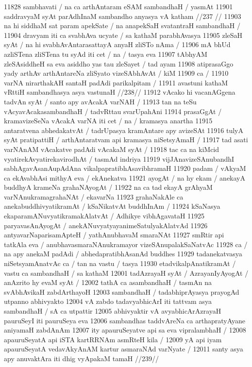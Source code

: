 11828 sambhavati / na ca arthAntaram eSAM sambandhaH / yasmAt
11901 	saddravyaM syAt parAdhInaM sambandho anyasya vA katham //237 //
11903 na hi siddhaM sat param apekSate / na anapekSaH svatantraH sambandhaH /
11904 dravyam iti ca svabhAva ucyate / sa kathaM parabhAvasya  
11905 zleSaH syAt / na hi svabhAvAntarasattayA anyaH zliSTo nAma / 
11906 mA bhUd azliSTena zliSTena tu syAd iti cet / na / tasya eva
11907 tAbhyAM zleSAsiddheH sa eva asiddho yas tau zleSayet / tad ayam 
11908 atiprasaGgo yady arthAv arthAntareNa zliSyato vizeSAbhAvAt / kiM
11909 ca / 
11910 	varNA nirarthakAH santaH padAdi parikalpitam /
11911 	avastuni kathaM vRttiH sambandhasya asya vastunaH //238//
11912 vAcako hi vacanAGgena tadvAn syAt / santo apy avAcakA varNAH / 
11913 tan na teSu vAcyavAcakasambandhaH / tadvRttau svarUpahAni 
11914 prasaGgAt / kramavizeSeNa vAcakA varNA iti cet / na / kramasya anartha
11915 antaratvena abhedakatvAt / tadrUpasya kramAntare apy avizeSAt 
11916 tulyA syAt pratipattiH / arthAntaratvam api kramasya niSetsyAmaH / 
11917 tad asati varNAnAM vAcakatve padAdi vAcakaM syAt /
11918 tac ca na kiMcid vyatirekAvyatirekavirodhAt / tasmAd indriya  
11919 vijJAnavizeSAnubandhI sabhAgavAsanAupAdAna vikalpapratibhAsavibhramaH
11920 padam / vAkyaM ca ekAvabhAsi mithyA eva / ekAnekatva  
11921 ayogAt / na hy ekam / anekayA buddhyA krameNa grahaNAyogAt /  
11922 na ca tad ekayA grAhyaM varNAnukramagrahaNAt / ekavarNa  
11923 grahaNakAle ca anekabuddhivyatikramAt / kSaNikatvAt buddhInAm /
11924 kSaNasya ekaparamANuvyatikramakAlatvAt / Adhikye vibhAgavataH  
11925 paryavasAnAyogAt / anekANuvyatyayanimeSatulyakAlatvAd 
11926 antyavarNaparisamApteH / yathAnubhavaM smaraNAt  
11927 smRtir api tatkAla eva / anubhavasmaraNAnukramayor vizeSAnupalakSaNatvAc
11928 ca / na apy anekaM padAdi / abhedapratibhAsanAd buddhes 
11929 tadanekatvasya niSetsyamAnatvAc ca / tan na vastu / tasya  
11930 etadvikalpAnatikramAt / vastu ca sambandhaH / sa kathaM
12001 tadAzrayaH syAt / AzrayanIyAyogAt / anAzrito hy evaM syAt /  
12002 tathA ca asambandhaH / tasmAn na svAbhAvikaH zabdArthayoH  
12003 sambandhaH / tadabhiprAyasya prayogAd utpanno abhivyakto
12004 vA zabdo tadavyabhicArI iti tattvam asya sambandhaH / sA ca utpattir  
12005 abhivyaktir vA avyabhicArAzrayaH pauruSeyI iti pauruSeya eva  
12006 sambandhas taddvAreNa ca arthapratyAyane aniyamaH zabdAnAm 
12007 ity apauruSeyatve api sa eva vipralambhaH / 
12008 	apauruSeyatA api iSTA kartRRNAm asmRteH kila /
12009 yA api iyam apauruSeyatA vedavAkyAnAM kartur asmaraNAd varNyate /  
12011 	santy asya apy anuvaktAra iti dhig vyApakaM tamaH //239// 
